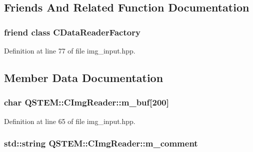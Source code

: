 \subsection{Friends And Related Function Documentation}
\hypertarget{class_q_s_t_e_m_1_1_c_img_reader_aca836cc1b4ddeea5a67e8ff13e66c51f}{
\subsubsection[{C\-Data\-Reader\-Factory}]{\setlength{\rightskip}{0pt plus 5cm}friend class {\bf C\-Data\-Reader\-Factory}\hspace{0.3cm}{\ttfamily [friend]}}}\label{class_q_s_t_e_m_1_1_c_img_reader_aca836cc1b4ddeea5a67e8ff13e66c51f}


Definition at line 77 of file img\-\_\-input.\-hpp.



\subsection{Member Data Documentation}
\hypertarget{class_q_s_t_e_m_1_1_c_img_reader_a9ae588dd89cb7517d582300bcfbb0aba}{
\subsubsection[{m\-\_\-buf}]{\setlength{\rightskip}{0pt plus 5cm}char Q\-S\-T\-E\-M\-::\-C\-Img\-Reader\-::m\-\_\-buf\mbox{[}200\mbox{]}\hspace{0.3cm}{\ttfamily [protected]}}}\label{class_q_s_t_e_m_1_1_c_img_reader_a9ae588dd89cb7517d582300bcfbb0aba}


Definition at line 65 of file img\-\_\-input.\-hpp.

\hypertarget{class_q_s_t_e_m_1_1_c_img_reader_a027b20904b4869088f6bbabdd28447bf}{
\subsubsection[{m\-\_\-comment}]{\setlength{\rightskip}{0pt plus 5cm}std\-::string Q\-S\-T\-E\-M\-::\-C\-Img\-Reader\-::m\-\_\-comment\hspace{0.3cm}{\ttfamily [protected]}}}\label{class_q_s_t_e_m_1_1_c_img_reader_a027b20904b4869088f6bbabdd28447bf}


